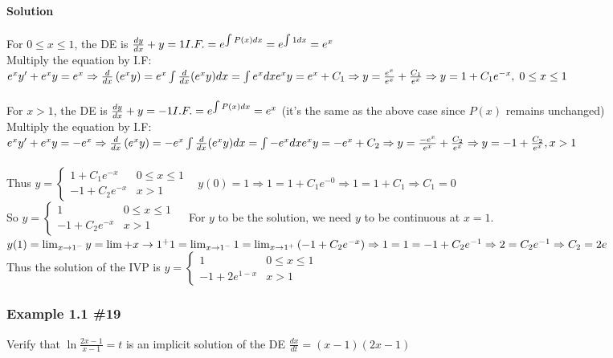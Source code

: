 \documentclass{article}
\begin{document}
\paragraph{Solution} For $0\leq x\leq 1$, the DE is $\frac{dy}{dx}+y=1
\\I.F.=e^{\int P(x)dx}=e^{\int 1dx}=e^x$
\\Multiply the equation by I.F: $e^xy'+e^xy=e^x\Rightarrow \frac{d}{dx}\left(e^xy\right)=e^x
\\\int \frac{d}{dx}(e^xy)dx=\int e^xdx
\\e^xy=e^x+C_1\Rightarrow y=\frac{e^x}{e^x}+\frac{C_1}{e^x}\Rightarrow y=1+C_1e^{-x},\;0\leq x\leq1
$
\\\\For $x>1$, the DE is $\frac{dy}{dx}+y=-1
\\I.F.=e^{\int P(x)dx}=e^x$ (it's the same as the above case since $P(x)$ remains unchanged)
\\Multiply the equation by I.F: $e^xy'+e^xy=-e^x\Rightarrow \frac{d}{dx}\left(e^xy\right)=-e^x
\\\int \frac{d}{dx}(e^xy)dx=\int -e^xdx
\\e^xy=-e^x+C_2\Rightarrow y=\frac{-e^x}{e^x}+\frac{C_2}{e^x}\Rightarrow y=-1+\frac{C_2}{e^x}, x>1$
\\\\Thus $y=\begin{cases}
    1+C_1e^{-x} & 0\leq x\leq1 \\
    -1+C_2e^{-x} & x>1
\end{cases}\;\;\;y(0)=1\Rightarrow1=1+C_1e^{-0}\Rightarrow1=1+C_1\Rightarrow C_1=0$
\\So $y=\begin{cases}
    1 & 0\leq x\leq1\\
    -1+C_2e^{-x} & x>1
\end{cases}\;\;\;$
For $y$ to be the solution, we need $y$ to be continuous at $x=1$.
\\$y(1)=\lim_{x \to 1^-}y=\lim+{x\to 1^+}
\\1=\lim_{x\to 1^-}1=\lim_{x\to 1^+}\left(-1+C_2e^{-x}\right)
\Rightarrow1=1=-1+C_2e^{-1}\Rightarrow2=C_2e^{-1}\Rightarrow C_2=2e$
\\Thus the solution of the IVP is $y=\begin{cases}
    1 & 0\leq x\leq1 \\
    -1+2e^{1-x} & x>1
\end{cases}$


\subsubsection{Example 1.1 \#19} Verify that $\ln{\frac{2x-1}{x-1}}=t$ is an implicit solution of the DE $\frac{dx}{dt}=(x-1)(2x-1)$
\end{document}
